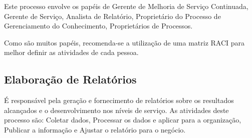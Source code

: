 Este processo envolve os papéis de Gerente de Melhoria de Serviço Continuada,
Gerente de Serviço, Analista de Relatório, Proprietário do Processo de
Gerenciamento do Conhecimento, Proprietários de Processos.

Como são muitos papéis, recomenda-se a utilização de uma matriz RACI para
melhor definir as atividades de cada pessoa.


\subsection{Elaboração de Relatórios}
É responsável pela geração e fornecimento de relatórios sobre os resultados
alcançados e o desenvolvimento nos níveis de serviço. As atividades deste
processo são: Coletar dados, Processar os dados e aplicar para a organização,
Publicar a informação e Ajustar o relatório para o negócio.
